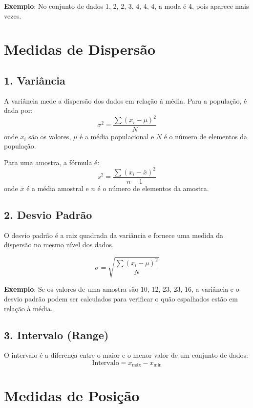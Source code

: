\documentclass{article}
\begin{document}
\textbf{Exemplo}: No conjunto de dados 1, 2, 2, 3, 4, 4, 4, a moda é 4, pois aparece mais vezes.

\section*{Medidas de Dispersão}

\subsection*{1. Variância}
A variância mede a dispersão dos dados em relação à média. Para a população, é dada por:
\begin{equation}
\sigma^2 = \frac{\sum (x_i - \mu)^2}{N}
\end{equation}
onde \(x_i\) são os valores, \(\mu\) é a média populacional e \(N\) é o número de elementos da população.

Para uma amostra, a fórmula é:
\begin{equation}
s^2 = \frac{\sum (x_i - \bar{x})^2}{n-1}
\end{equation}
onde \(\bar{x}\) é a média amostral e \(n\) é o número de elementos da amostra.

\subsection*{2. Desvio Padrão}
O desvio padrão é a raiz quadrada da variância e fornece uma medida da dispersão no mesmo nível dos dados.

\begin{equation}
\sigma = \sqrt{\frac{\sum (x_i - \mu)^2}{N}}
\end{equation}

\textbf{Exemplo}: Se os valores de uma amostra são 10, 12, 23, 23, 16, a variância e o desvio padrão podem ser calculados para verificar o quão espalhados estão em relação à média.

\subsection*{3. Intervalo (Range)}
O intervalo é a diferença entre o maior e o menor valor de um conjunto de dados:
\begin{equation}
\text{Intervalo} = x_{\text{máx}} - x_{\text{mín}}
\end{equation}

\section*{Medidas de Posição}
\end{document}
